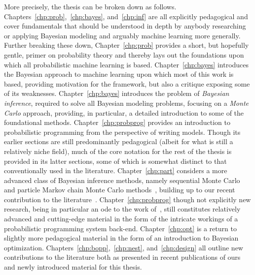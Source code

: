 More precisely, the thesis can be broken down as follows.
Chapters~\ref{chp:prob},~\ref{chp:bayes}, and~\ref{chp:inf} are all explicitly pedagogical
and cover fundamentals that should be understood in depth by anybody researching or
applying Bayesian modeling and arguably machine learning more generally.  Further breaking these down,
Chapter~\ref{chp:prob} provides a short, but hopefully gentle, primer on probability theory and
thereby lays out the foundations upon which all probabilistic machine learning is based.
Chapter~\ref{chp:bayes} introduces the Bayesian approach to machine learning upon which most of
this work is based, providing motivation for the framework, but also a critique exposing some of its weaknesses. 
Chapter~\ref{chp:bayes} introduces the problem of \emph{Bayesian inference}, required to solve all Bayesian
modeling problems, focusing on a \emph{Monte Carlo} approach, providing, in particular, a detailed
introduction to some of the foundational methods.
Chapter~\ref{chp:probprog} provides an introduction to
probabilistic programming from the perspective of writing models.  Though its earlier
sections are still predominantly pedagogical (albeit for what is still a relatively niche field),
much of the core notation for the rest of the thesis is provided in its latter sections, some of
which is somewhat distinct to that conventionally used in the literature.
Chapter~\ref{chp:part} considers a more advanced class of Bayesian inference methods,
namely sequential Monte Carlo~\citep{doucet2009tutorial} and particle Markov chain Monte
Carlo methods~\citep{andrieu2010particle},
building up to our recent contribution to the literature~\citep{rainforth2016interacting}.
Chapter~\ref{chp:probprog} though not explicitly new research, being in particular an ode
to the work of~\cite{tolpin2016design}, still constitutes
relatively advanced and cutting-edge material in the form of the intricate workings
of a probabilistic programming system back-end.   Chapter~\ref{chp:opt} is a return
to slightly more pedagogical material in the form of an introduction to Bayesian optimization.
Chapters~\ref{chp:bopp},~\ref{chp:nest}, and~\ref{chp:design} all outline new
contributions to the literature both as presented in recent publications of
ours~\citep{rainforth2016bayesian,rainforth2017pitfalls,vincent2017darc} and newly introduced
material for this thesis.